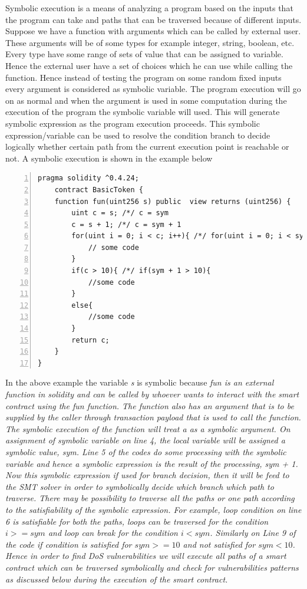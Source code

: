\documentclass{article}
\begin{document}
Symbolic execution is a means of analyzing a program based on the inputs that the program can take and paths that can be traversed because of different inputs. Suppose we have a function with arguments which can be called by external user. These arguments will be of some types for example integer, string, boolean, etc. Every type have some range of sets of value that can be assigned to variable. Hence the external user have a set of choices which he can use while calling the function. Hence instead of testing the program on some random fixed inputs every argument is considered as symbolic variable. The program execution will go on as normal and when the argument is used in some computation during the execution of the program the symbolic variable will used. This will generate symbolic expression as the program execution proceeds. This symbolic expression/variable can be used to resolve the condition branch to decide logically whether certain path from the current execution point is reachable or not. A symbolic execution is shown in the example below
\begin{Verbatim}[numbers=left,xleftmargin=5mm]
    pragma solidity ^0.4.24;
    contract BasicToken {
    function fun(uint256 s) public  view returns (uint256) {
        uint c = s; /*/ c = sym
        c = s + 1; /*/ c = sym + 1
        for(uint i = 0; i < c; i++){ /*/ for(uint i = 0; i < sym + 1; i++){
            // some code
        }
        if(c > 10){ /*/ if(sym + 1 > 10){
            //some code
        }
        else{
            //some code
        }
        return c;
    }
}
\end{Verbatim}
In the above example the variable \emph{s} is symbolic because \em{fun} is an external function in solidity and can be called by whoever wants to interact with the smart contract using the \emph{fun} function. The function also has an argument that is to be supplied by the caller through transaction payload that is used to call the function. The symbolic execution of the function will treat \em{a} as a symbolic argument. On assignment of symbolic variable on line 4, the local variable will be assigned a symbolic value, \em{sym}. Line 5 of the codes do some processing with the symbolic variable and hence a symbolic expression is the result of the processing, \em{sym + 1}. Now this symbolic expression if used for branch decision, then it will be feed to the SMT solver in order to symbolically decide which branch which path to traverse. There may be possibility to traverse all the paths or one path according to the satisfiability of the symbolic expression. For example, loop condition on line 6 is satisfiable for both the paths, loops can be traversed for the condition $i >= sym$ and loop can break for the condition $i < sym$. Similarly on Line 9 of the code if condition is satisfied for $sym >= 10$ and not satisfied for $sym < 10$.\\
Hence in order to find DoS vulnerabilities we will execute all paths of a smart contract which can be traversed symbolically and check for vulnerabilities patterns as discussed below during the execution of the smart contract.\\
\\
\end{document}
